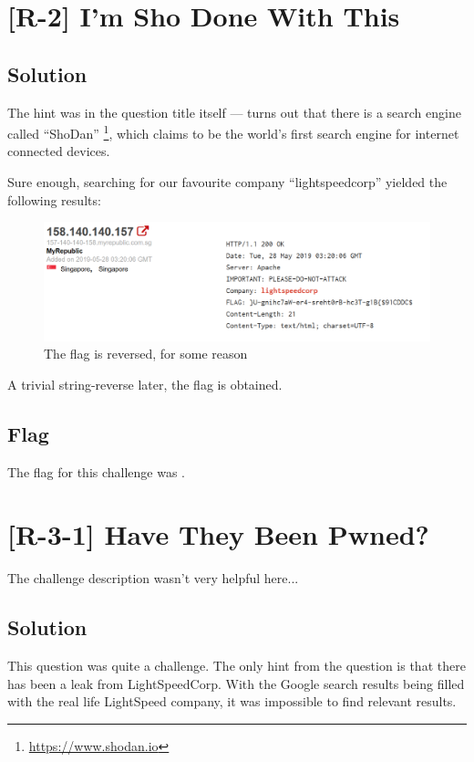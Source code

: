 

\pagebreak
\section{[R-2] I'm Sho Done With This}

	\subsection{Solution}

		The hint was in the question title itself --- turns out that there is a search engine called \enquote{ShoDan}
		\footnote{\url{https://www.shodan.io}}, which claims to be the world's first search engine for internet connected devices.

		Sure enough, searching for our favourite company \enquote{lightspeedcorp} yielded the following results:

		\begin{figure}[!htbp]\centering
			\includegraphics[width=150mm]{figures/osintred/r2.png} \vspace{5mm}
			\caption{The flag is reversed, for some reason}
		\end{figure}

		A trivial string-reverse later, the flag is obtained.


	\subsection{Flag}
		The flag for this challenge was .




\pagebreak
\section{[R-3-1] Have They Been Pwned?}

	The challenge description wasn't very helpful here...

	\subsection{Solution}
		This question was quite a challenge. The only hint from the question is that there has been a leak from LightSpeedCorp.
		With the Google search results being filled with the real life LightSpeed company, it was impossible to find relevant
		results.

